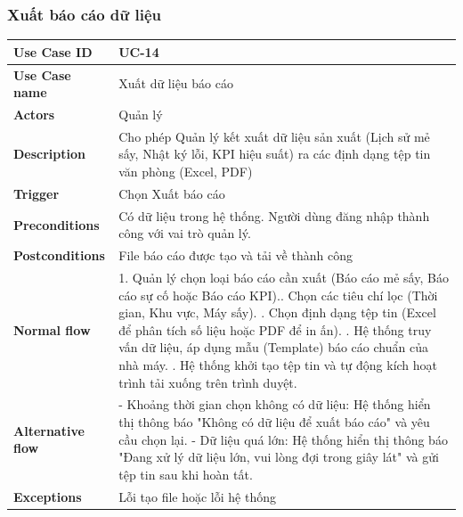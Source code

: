 \subsubsection{Xuất báo cáo dữ liệu}
\begin{tabular}{|p{3.5cm}|p{10.5cm}|}
\hline
\textbf{Use Case ID} & UC-14 \\
\hline
\textbf{Use Case name} & Xuất dữ liệu báo cáo \\
\hline
\textbf{Actors} & Quản lý \\
\hline
\textbf{Description} & 
Cho phép Quản lý kết xuất dữ liệu sản xuất (Lịch sử mẻ sấy, Nhật ký lỗi, KPI hiệu suất) ra các định dạng tệp tin văn phòng (Excel, PDF)\\
\hline
\textbf{Trigger} & Chọn Xuất báo cáo \\
\hline
\textbf{Preconditions} & Có dữ liệu trong hệ thống. Người dùng đăng nhập thành công với vai trò quản lý. \\
\hline
\textbf{Postconditions} & File báo cáo được tạo và tải về thành công \\
\hline
\textbf{Normal flow} & 
1. Quản lý chọn loại báo cáo cần xuất (Báo cáo mẻ sấy, Báo cáo sự cố hoặc Báo cáo KPI).\newline
 2. Chọn các tiêu chí lọc (Thời gian, Khu vực, Máy sấy). \newline
3. Chọn định dạng tệp tin (Excel để phân tích số liệu hoặc PDF để in ấn). \newline
4. Hệ thống truy vấn dữ liệu, áp dụng mẫu (Template) báo cáo chuẩn của nhà máy. \newline
5. Hệ thống khởi tạo tệp tin và tự động kích hoạt trình tải xuống trên trình duyệt.\\
\hline
\textbf{Alternative flow} & 
 - Khoảng thời gian chọn không có dữ liệu: Hệ thống hiển thị thông báo "Không có dữ liệu để xuất báo cáo" và yêu cầu chọn lại.\newline
- Dữ liệu quá lớn: Hệ thống hiển thị thông báo "Đang xử lý dữ liệu lớn, vui lòng đợi trong giây lát" và gửi tệp tin sau khi hoàn tất. \\
\hline
\textbf{Exceptions} & Lỗi tạo file hoặc lỗi hệ thống \\
\hline
\end{tabular}

